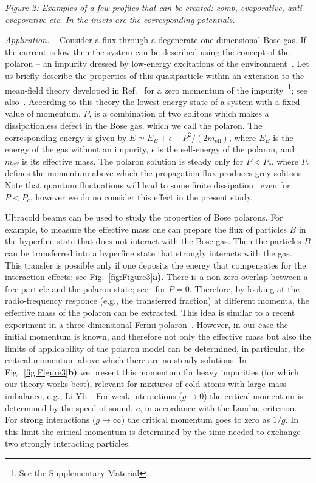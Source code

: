 \documentclass[twocolumn,amsmath,amssymb,showpacs,prl,superscriptaddress,aps]{revtex4-1}
\begin{document}
{\it Figure 2: Examples of a few profiles that can be created: comb, evaporative, anti-evaporative etc. In the insets are the corresponding potentials.}

{\it Application. --} Consider a flux through a degenerate 
one-dimensional Bose gas. If the current is low then the system 
can be described using the concept of the polaron -- an impurity dressed by low-energy excitations 
of the environment~\cite{landau1948}. Let us briefly describe the properties of this quasiparticle
within an extension to the mean-field theory developed in Ref.~\cite{volosniev2017}
for a zero momentum of the impurity~\footnote{See the Supplementary Material}; see also~\cite{kain2016, parisi2017,grusdt2017, pastukhov2017}. 
According to this theory the lowest energy state of a system with a fixed value of momentum, $P$, 
is a combination of two solitons which makes a dissipationless defect in the Bose gas, which we call the polaron. The corresponding energy 
is given by $E\simeq E_B+\epsilon+P^2/(2m_{\mathrm{eff}})$, where $E_B$ is the energy of the gas without an impurity, 
$\epsilon$ is the self-energy of the polaron, and $m_{\mathrm{eff}}$ is its effective mass. The polaron solution is steady only 
for $P<P_c$, where $P_c$ defines the momentum above which the propagation flux produces grey solitons. 
Note that quantum fluctuations will lead to some finite dissipation~\cite{astrakharchik2004,sykes2009} even for $P<P_c$, however
we do no consider this effect in the present study.

Ultracold beams can be used to study the properties of Bose polarons. For example, to measure the effective 
mass one can prepare the flux of particles $B$ in the hyperfine state that does not 
interact with the Bose gas. Then the particles $B$ can be transferred into a hyperfine state that strongly interacts with the gas.
This transfer is possible only if one deposits the energy that compensates for the interaction effects; see Fig.~\ref{fig:Figure3}{\bf a)}. 
There is a non-zero overlap between a free particle and the polaron state; see~\cite{volosniev2017} for $P=0$.
Therefore, by looking at the radio-frequency responce (e.g., the transferred fraction) at different momenta, the effective mass of the polaron can be extracted. 
This idea is similar to a recent experiment in a three-dimensional Fermi polaron~\cite{zaccanti2017}. However,
in our case the initial momentum is known, and therefore not only the effective mass but also the limits of applicability 
of the polaron model can be determined, in particular, the critical momentum above which there are no steady solutions.
In Fig.~\ref{fig:Figure3}{\bf b)} we present this momentum for heavy impurities (for which our theory works best), relevant 
for mixtures of cold atoms with large mass imbalance, e.g., Li-Yb~\cite{takahashi2018}.
For weak interactions ($g\to 0$) the critical momentum is determined by the speed of sound, $c$, in accordance with the Landau criterion.
For strong interactions ($g\to \infty$) the critical momentum goes to zero as $1/g$.  
In this limit the critical momentum is determined by the time needed to exchange two strongly interacting particles. 
 
\end{document}
